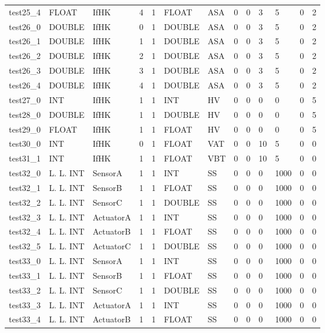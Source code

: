 \begin{longtable}{|l|l|l|p{0.5cm}|p{0.5cm}|l|p{0.5cm}|p{0.5cm}|p{0.5cm}|l|l|p{0.5cm}|l|}
test25\_4 & FLOAT & IfHK & 4 & 1 & FLOAT & ASA & 0 & 0 & 3 & 5 & 0 & 2 \\
test26\_0 & DOUBLE & IfHK & 0 & 1 & DOUBLE & ASA & 0 & 0 & 3 & 5 & 0 & 2 \\
test26\_1 & DOUBLE & IfHK & 1 & 1 & DOUBLE & ASA & 0 & 0 & 3 & 5 & 0 & 2 \\
test26\_2 & DOUBLE & IfHK & 2 & 1 & DOUBLE & ASA & 0 & 0 & 3 & 5 & 0 & 2 \\
test26\_3 & DOUBLE & IfHK & 3 & 1 & DOUBLE & ASA & 0 & 0 & 3 & 5 & 0 & 2 \\
test26\_4 & DOUBLE & IfHK & 4 & 1 & DOUBLE & ASA & 0 & 0 & 3 & 5 & 0 & 2 \\
test27\_0 & INT & IfHK & 1 & 1 & INT & HV & 0 & 0 & 0 & 0 & 0 & 5 \\
test28\_0 & DOUBLE & IfHK & 1 & 1 & DOUBLE & HV & 0 & 0 & 0 & 0 & 0 & 5 \\
test29\_0 & FLOAT & IfHK & 1 & 1 & FLOAT & HV & 0 & 0 & 0 & 0 & 0 & 5 \\
test30\_0 & INT & IfHK & 0 & 1 & FLOAT & VAT & 0 & 0 & 10 & 5 & 0 & 0 \\
test31\_1 & INT & IfHK & 1 & 1 & FLOAT & VBT & 0 & 0 & 10 & 5 & 0 & 0 \\
test32\_0 & L. L. INT & SensorA & 1 & 1 & INT & SS & 0 & 0 & 0 & 1000 & 0 & 0 \\
test32\_1 & L. L. INT & SensorB & 1 & 1 & FLOAT & SS & 0 & 0 & 0 & 1000 & 0 & 0 \\
test32\_2 & L. L. INT & SensorC & 1 & 1 & DOUBLE & SS & 0 & 0 & 0 & 1000 & 0 & 0 \\
test32\_3 & L. L. INT & ActuatorA & 1 & 1 & INT & SS & 0 & 0 & 0 & 1000 & 0 & 0 \\
test32\_4 & L. L. INT & ActuatorB & 1 & 1 & FLOAT & SS & 0 & 0 & 0 & 1000 & 0 & 0 \\
test32\_5 & L. L. INT & ActuatorC & 1 & 1 & DOUBLE & SS & 0 & 0 & 0 & 1000 & 0 & 0 \\
test33\_0 & L. L. INT & SensorA & 1 & 1 & INT & SS & 0 & 0 & 0 & 1000 & 0 & 0 \\
test33\_1 & L. L. INT & SensorB & 1 & 1 & FLOAT & SS & 0 & 0 & 0 & 1000 & 0 & 0 \\
test33\_2 & L. L. INT & SensorC & 1 & 1 & DOUBLE & SS & 0 & 0 & 0 & 1000 & 0 & 0 \\
test33\_3 & L. L. INT & ActuatorA & 1 & 1 & INT & SS & 0 & 0 & 0 & 1000 & 0 & 0 \\
test33\_4 & L. L. INT & ActuatorB & 1 & 1 & FLOAT & SS & 0 & 0 & 0 & 1000 & 0 & 0 \\

\end{longtable}
